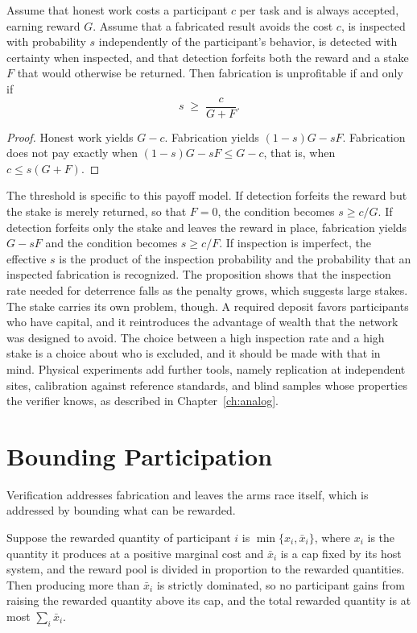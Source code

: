 \begin{proposition}
\label{prop:spotcheck}
Assume that honest work costs a participant $c$ per task and is always accepted, earning reward $G$. Assume that a fabricated result avoids the cost $c$, is inspected with probability $s$ independently of the participant's behavior, is detected with certainty when inspected, and that detection forfeits both the reward and a stake $F$ that would otherwise be returned. Then fabrication is unprofitable if and only if
\[
s\;\ge\;\frac{c}{G+F}.
\]
\end{proposition}

\begin{proof}
Honest work yields $G-c$. Fabrication yields $(1-s)G-sF$. Fabrication does not pay exactly when $(1-s)G-sF\le G-c$, that is, when $c\le s(G+F)$.
\end{proof}

The threshold is specific to this payoff model. If detection forfeits the reward but the stake is merely returned, so that $F=0$, the condition becomes $s\ge c/G$. If detection forfeits only the stake and leaves the reward in place, fabrication yields $G-sF$ and the condition becomes $s\ge c/F$. If inspection is imperfect, the effective $s$ is the product of the inspection probability and the probability that an inspected fabrication is recognized. The proposition shows that the inspection rate needed for deterrence falls as the penalty grows, which suggests large stakes. The stake carries its own problem, though. A required deposit favors participants who have capital, and it reintroduces the advantage of wealth that the network was designed to avoid. The choice between a high inspection rate and a high stake is a choice about who is excluded, and it should be made with that in mind. Physical experiments add further tools, namely replication at independent sites, calibration against reference standards, and blind samples whose properties the verifier knows, as described in Chapter~\ref{ch:analog}.

\section{Bounding Participation}

Verification addresses fabrication and leaves the arms race itself, which is addressed by bounding what can be rewarded.

\begin{proposition}
\label{prop:cap}
Suppose the rewarded quantity of participant $i$ is $\min\{x_i,\bar x_i\}$, where $x_i$ is the quantity it produces at a positive marginal cost and $\bar x_i$ is a cap fixed by its host system, and the reward pool is divided in proportion to the rewarded quantities. Then producing more than $\bar x_i$ is strictly dominated, so no participant gains from raising the rewarded quantity above its cap, and the total rewarded quantity is at most $\sum_i\bar x_i$.
\end{proposition}

